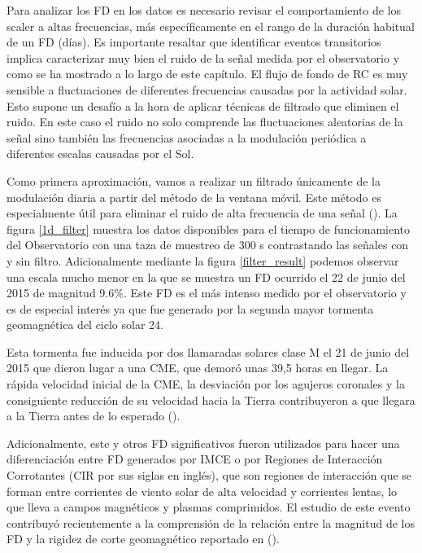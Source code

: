 
Para analizar los FD en los datos es necesario revisar el comportamiento de los scaler a altas frecuencias, más específicamente en el rango de la duración habitual de un FD (días). Es importante resaltar que identificar eventos transitorios implica caracterizar muy bien el ruido de la señal medida por el observatorio y como se ha mostrado a lo largo de este capítulo. El flujo de fondo de RC es muy sensible a fluctuaciones de diferentes frecuencias causadas por la actividad solar. Esto supone un desafío a la hora de aplicar técnicas de filtrado que eliminen el ruido. En este caso el ruido no solo comprende las fluctuaciones aleatorias de la señal sino también las frecuencias asociadas a la modulación periódica a diferentes escalas causadas por el Sol. 

Como primera aproximación, vamos a realizar un filtrado únicamente de la modulación diaria a partir del método de la ventana móvil. Este método es especialmente útil para eliminar el ruido de alta frecuencia de una señal (\cite{Davies_2023}). La figura \ref{1d_filter} muestra los datos disponibles para el tiempo de funcionamiento del Observatorio con una taza de muestreo de 300 s contrastando las señales con y sin filtro. Adicionalmente mediante  la figura \ref{filter_result} podemos observar una escala mucho menor en la que se muestra un FD ocurrido el 22 de junio del 2015 de magnitud $9.6\%$. Este FD es el más intenso medido por el observatorio y es de especial interés ya que fue generado por la segunda mayor tormenta geomagnética del ciclo solar 24. 

Esta tormenta fue inducida por dos llamaradas solares clase M el 21 de junio del 2015 que dieron lugar a una CME, que demoró unas 39,5 horas en llegar.  La rápida velocidad inicial de la CME, la desviación por los agujeros coronales y la consiguiente reducción de su velocidad hacia la Tierra contribuyeron a que llegara a la Tierra antes de lo esperado (\cite{gopalswamy_2018}). 

Adicionalmente, este  y otros FD significativos fueron utilizados para hacer una diferenciación entre FD generados por IMCE o por Regiones de Interacción Corrotantes (CIR por sus siglas en inglés), que son regiones de interacción que se forman entre corrientes de viento solar de alta velocidad y corrientes lentas, lo que lleva a campos magnéticos y plasmas comprimidos. El estudio de este evento contribuyó recientemente a la comprensión de la relación entre la magnitud de los FD y la rigidez de corte geomagnético reportado en (\cite{wang_2023}).

